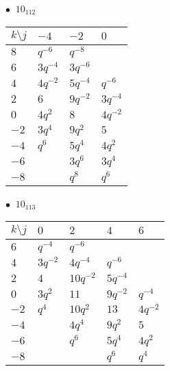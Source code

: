 \begin{minipage}{\linewidth}
$\bullet\ $ $10_{112}$ \vspace{0.5em} \\
\begin{tabular}{l|lll}
$k \setminus j$ & $-4$ & $-2$ & $0$ \\
\hline
$8$ & $q^{-6}$ & $q^{-8}$ &  \\
$6$ & $3q^{-4}$ & $3q^{-6}$ &  \\
$4$ & $4q^{-2}$ & $5q^{-4}$ & $q^{-6}$ \\
$2$ & $6$ & $9q^{-2}$ & $3q^{-4}$ \\
$0$ & $4q^{2}$ & $8$ & $4q^{-2}$ \\
$-2$ & $3q^{4}$ & $9q^{2}$ & $5$ \\
$-4$ & $q^{6}$ & $5q^{4}$ & $4q^{2}$ \\
$-6$ &  & $3q^{6}$ & $3q^{4}$ \\
$-8$ &  & $q^{8}$ & $q^{6}$ \\
\end{tabular}
\vspace{2em}
\end{minipage}
%
\begin{minipage}{\linewidth}
$\bullet\ $ $10_{113}$ \vspace{0.5em} \\
\begin{tabular}{l|llll}
$k \setminus j$ & $0$ & $2$ & $4$ & $6$ \\
\hline
$6$ & $q^{-4}$ & $q^{-6}$ &  &  \\
$4$ & $3q^{-2}$ & $4q^{-4}$ & $q^{-6}$ &  \\
$2$ & $4$ & $10q^{-2}$ & $5q^{-4}$ &  \\
$0$ & $3q^{2}$ & $11$ & $9q^{-2}$ & $q^{-4}$ \\
$-2$ & $q^{4}$ & $10q^{2}$ & $13$ & $4q^{-2}$ \\
$-4$ &  & $4q^{4}$ & $9q^{2}$ & $5$ \\
$-6$ &  & $q^{6}$ & $5q^{4}$ & $4q^{2}$ \\
$-8$ &  &  & $q^{6}$ & $q^{4}$ \\
\end{tabular}
\vspace{2em}
\end{minipage}
%
